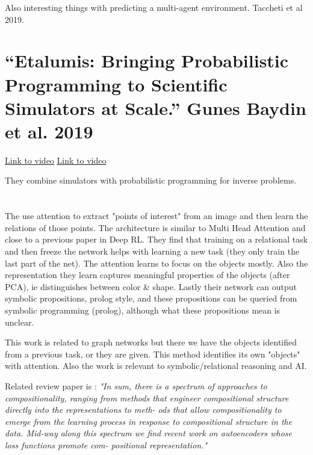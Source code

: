 \documentclass{article}
\newcommand{\citeall}[1]{\citeauthor{#1}}
\begin{document}
Also interesting things with predicting a multi-agent environment. Taccheti et al 2019.

\section{“Etalumis: Bringing Probabilistic Programming to Scientific Simulators at Scale.” Gunes Baydin et al. 2019}

\href{https://www.youtube.com/watch?v=aCh_n2yzSRc}{Link to video}
\href{http://www.ipam.ucla.edu/abstract/?tid=16191}{Link to video}

They combine simulators with probabilistic programming for inverse problems. 

\section{\citeall{Shanahan2019AnArchitecture}}

The use attention to extract "points of interest" from an image and then learn the relations of those points. The architecture is similar to Multi Head Attention \cite{Vaswani2017AttentionNeed} and close to a previous paper in Deep RL. They find that training on a relational task and then freeze the network helps with learning a new task (they only train the last part of the net). The attention learns to focus on the objects mostly. Also the representation they learn captures meaningful properties of the objects (after PCA), ie distinguishes between color & shape. Lastly their network can output symbolic propositions, prolog style, and these propositions can be queried from symbolic programming (prolog), although what these propositions mean is unclear. 

This work is related to graph networks but there we have the objects identified from a previous task, or they are given. This method identifies its own "objects" with attention. Also the work is relevant to symbolic/relational reasoning and AI.

Related review paper is \cite{Garnelo2019ReconcilingRelations}:
\textit{"In sum, there is a spectrum of approaches to compositionality, ranging from methods that engineer compositional structure directly into the representations to meth- ods that allow compositionality to emerge from the learning process in response to compositional structure in the data. Mid-way along this spectrum we find recent work on autoencoders whose loss functions promote com- positional representation."}
\end{document}
